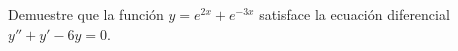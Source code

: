 \item Demuestre que la función $y = e^{2x} + e^{-3x}$ satisface la ecuación diferencial $y'' + y' - 6y = 0$.
